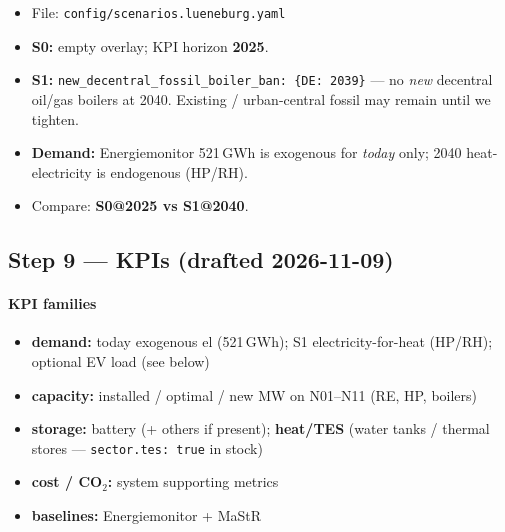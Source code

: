 \documentclass[11pt,a4paper]{article}
\begin{document}
\begin{itemize}[leftmargin=*]
  \item File: \texttt{config/scenarios.lueneburg.yaml}
  \item \textbf{S0:} empty overlay; KPI horizon \textbf{2025}.
  \item \textbf{S1:} \texttt{new\_decentral\_fossil\_boiler\_ban: \{DE: 2039\}}
        --- no \emph{new} decentral oil/gas boilers at 2040.
        Existing / urban-central fossil may remain until we tighten.
  \item \textbf{Demand:} Energiemonitor 521\,GWh is exogenous for \emph{today} only;
        2040 heat-electricity is endogenous (HP/RH).
  \item Compare: \textbf{S0@2025 vs S1@2040}.
\end{itemize}

\subsection{Step 9 --- KPIs (drafted 2026-11-09)}

\noindent{}

\vspace{0.6em}
\noindent{}

\paragraph{KPI families}
\begin{itemize}[leftmargin=*]
  \item \textbf{demand:} today exogenous el (521\,GWh); S1 electricity-for-heat (HP/RH);
        optional EV load (see below)
  \item \textbf{capacity:} installed / optimal / new MW on N01--N11 (RE, HP, boilers)
  \item \textbf{storage:} battery (+ others if present); \textbf{heat/TES}
        (water tanks / thermal stores --- \texttt{sector.tes: true} in stock)
  \item \textbf{cost / CO$_2$:} system supporting metrics
  \item \textbf{baselines:} Energiemonitor + MaStR
\end{itemize}
\end{document}
